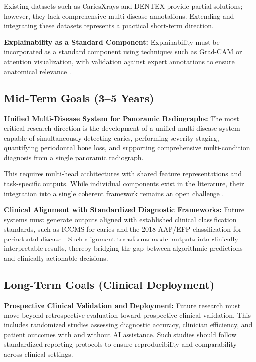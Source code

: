 \documentclass[conference]{IEEEtran}
\begin{document}
Existing datasets such as CariesXrays \cite{chen2024cariesxrays} and
DENTEX \cite{nassiri2025yolo} provide partial solutions; however, they
lack comprehensive multi-disease annotations. Extending and integrating
these datasets represents a practical short-term direction.

\textbf{Explainability as a Standard Component:} Explainability must be
incorporated as a standard component using techniques such as Grad-CAM
or attention visualization, with validation against expert annotations
to ensure anatomical relevance
\cite{kaushik2025densenet201,bilal2024pdcnet}.

\subsection{Mid-Term Goals (3--5 Years)}

\textbf{Unified Multi-Disease System for Panoramic Radiographs:} The
most critical research direction is the development of a unified
multi-disease system capable of simultaneously detecting caries,
performing severity staging, quantifying periodontal bone loss, and
supporting comprehensive multi-condition diagnosis from a single
panoramic radiograph.

This requires multi-head architectures with shared feature
representations and task-specific outputs. While individual components
exist in the literature, their integration into a single coherent
framework remains an open challenge
\cite{nassiri2025yolo,chen2023deep,jundaeng2025advanced,
muresanu2024automating}.

\textbf{Clinical Alignment with Standardized Diagnostic Frameworks:}
Future systems must generate outputs aligned with established clinical
classification standards, such as ICCMS for caries and the 2018 AAP/EFP
classification for periodontal disease \cite{chmielewski20252018}. Such
alignment transforms model outputs into clinically interpretable
results, thereby bridging the gap between algorithmic predictions and
clinically actionable decisions.

\subsection{Long-Term Goals (Clinical Deployment)}

\textbf{Prospective Clinical Validation and Deployment:} Future
research must move beyond retrospective evaluation toward prospective
clinical validation. This includes randomized studies assessing
diagnostic accuracy, clinician efficiency, and patient outcomes with
and without AI assistance. Such studies should follow standardized
reporting protocols to ensure reproducibility and comparability across
clinical settings.
\end{document}
